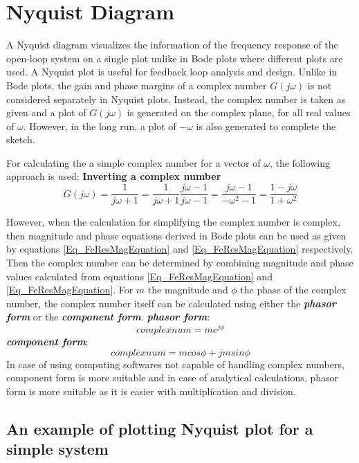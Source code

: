 \section{Nyquist Diagram}

A Nyquist diagram visualizes the information of the frequency response of the open-loop system on a single plot unlike in Bode plots where different plots are used. A Nyquist plot is useful for feedback loop analysis and design. Unlike in Bode plots, the gain and phase margins of a complex number $G(j\omega)$ is not considered separately in Nyquist plots. Instead, the complex number is taken as given and a plot of $G(j\omega)$ is generated on the complex plane, for all real values of $\omega$. However, in the long run, a plot of $-\omega$ is also generated to complete the sketch.

For calculating the a simple complex number for a vector of $\omega$, the following approach is used:
\textbf{Inverting a complex number}
\begin{equation*}
	G(j\omega) = \frac{1}{j \omega + 1} = \frac{1}{j \omega + 1} \frac{j \omega - 1}{j \omega - 1} = \frac{j \omega - 1}{-\omega^2 - 1} = \frac{1 - j\omega}{1 + \omega^2}
\end{equation*}

However, when the calculation for simplifying the complex number is complex, then magnitude and phase equations derived in Bode plots can be used as given by equations \eqref{Eq_FeResMagEquation} and \eqref{Eq_FeResMagEquation} respectively. Then the complex number can be determined by combining magnitude and phase values calculated from equations \eqref{Eq_FeResMagEquation} and \eqref{Eq_FeResMagEquation}. For $m$ the magnitude and $\phi$ the phase of the complex number, the complex number itself can be calculated using either the \textbf{\textit{phasor form}} or the \textbf{\textit{component form}}.
\textbf{\textit{phasor form}}:
\begin{equation}
	complex num = m e^{j \phi}	
\end{equation}
\textbf{\textit{component form}}:
\begin{equation}
	complex num = m cos\phi + j m sin\phi
\end{equation}
In case of using computing softwares not capable of handling complex numbers, component form is more suitable and in case of analytical calculations, phasor form is more suitable as it is easier with multiplication and division.

\subsection{An example of plotting Nyquist plot for a simple system}

